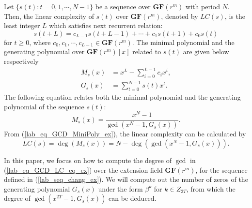 \documentclass{mcom-l}
\theoremstyle{definition}
\numberwithin{equation}{section}
\begin{document}
     Let $ \{s(t):t=0,1,\cdots,N-1\} $ be a sequence over $\mathbf{GF}(r^{m}) $ with period $ N $. Then, the linear complexity of $ s(t) $ over $ \mathbf{GF}(r^{m}) $, denoted by $ LC(s) $, is the least integer $ L $ which satisfies next recurrent relation:
      \begin{equation*}
      s(t+L)=c_{L-1}s(t+L-1)+\cdots+c_{1}s(t+1)+c_{0}s(t)
      \end{equation*}
    for $ t\ge 0 $, where $ c_{0},c_{1},\cdots,c_{L-1} \in  \mathbf{GF}(r^{m}) $.
    The minimal polynomial and the generating polynomial over  $ \mathbf{GF}(r^{m})[x]  $
    related to $ s(t) $ are given below respectively
    \begin{equation}\label{lab_eq_GCD_GP_ex}
    \begin{split}
    M_{s}(x)&=x^{L}-\sum_{i=0}^{L-1}c_{i}x^{i},\\
    G_{s}(x)&=\sum_{t=0}^{N-1}s(t)x^{t}.
    \end{split}
    \end{equation}
    The following equation relates both the minimal polynomial and the generating polynomial of the sequence $ s(t) $:
    \begin{equation}\label{lab_eq_GCD_MiniPoly_ex}
    M_{s}(x)=\frac{x^{N}-1}{\gcd(x^{N}-1,G_{s}(x))}.
    \end{equation}
    From (\ref{lab_eq_GCD_MiniPoly_ex}), the linear complexity can be calculated by
    \begin{equation}\label{lab_eq_GCD_LC_eq_ex}
    LC(s)=\deg(M_{s}(x))=N-\deg(\gcd(x^{N}-1,G_{s}(x))).
    \end{equation}
    
    In this paper, we focus on how to compute the degree of $ \gcd $ in (\ref{lab_eq_GCD_LC_eq_ex}) over the extension field $ \mathbf{GF}(r^{m}) $,  for the sequence defined in (\ref{lab_seq_chang_ex}). We will compute out the number of zeros of the generating polynomial $ G_{s}(x)$  under the form $ \beta^{k} $ for $  k\in Z_{2T} $, from which  the degree of $ \gcd(x^{2T}-1,G_{s}(x)) $ can be deduced.
    
\end{document}
